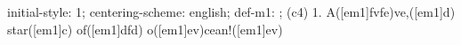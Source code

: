 initial-style: 1;
centering-scheme: english;
def-m1: \grealign;
(c4) 1. A([em1]fvfe)ve,([em1]d) star([em1]c) of([em1]dfd) o([em1]ev)cean!([em1]ev)
